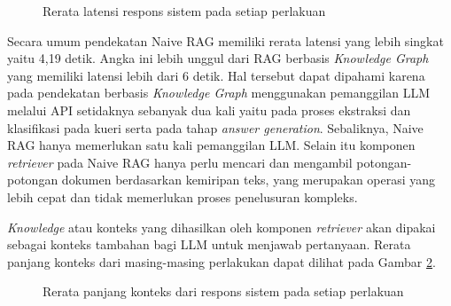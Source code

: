 \begin{figure}[H]
	\centering
	\caption{Rerata latensi respons sistem pada setiap perlakuan}
	\label{fig:latency-per-treatment}
\end{figure}

Secara umum pendekatan Naive RAG memiliki rerata latensi yang lebih singkat yaitu 4,19 detik.
Angka ini lebih unggul dari RAG berbasis \textit{Knowledge Graph} yang memiliki latensi lebih dari 6 detik.
Hal tersebut dapat dipahami karena pada pendekatan berbasis \textit{Knowledge Graph} menggunakan pemanggilan LLM melalui API setidaknya sebanyak dua kali yaitu pada proses ekstraksi dan klasifikasi pada kueri serta pada tahap \textit{answer generation}.
Sebaliknya, Naive RAG hanya memerlukan satu kali pemanggilan LLM.
Selain itu komponen \textit{retriever} pada Naive RAG hanya perlu mencari dan mengambil potongan-potongan dokumen berdasarkan kemiripan teks, yang merupakan operasi yang lebih cepat dan tidak memerlukan proses penelusuran kompleks.

\textit{Knowledge} atau konteks yang dihasilkan oleh komponen \textit{retriever} akan dipakai sebagai konteks tambahan bagi LLM untuk menjawab pertanyaan.
Rerata panjang konteks dari masing-masing perlakukan dapat dilihat pada Gambar \ref{fig:context-length-per-treatment}.

\begin{figure}[H]
	\centering
	\caption{Rerata panjang konteks dari respons sistem pada setiap perlakuan}
	\label{fig:context-length-per-treatment}
\end{figure}

